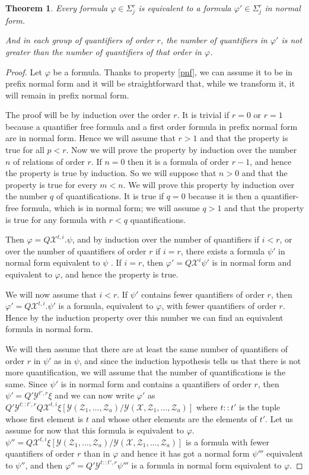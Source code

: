 \documentclass[a4paper,12pt]{article}
\newtheorem{theorem}{Theorem}[section]
\theoremstyle{definition}
\renewcommand{\phi}{\varphi}
\newcommand{\hob}[2]{\ensuremath{\Sigma^{#1}_{#2}}}
\newcommand{\mc}{\mathcal}
\begin{document}
\begin{theorem}
  Every formula $\phi\in\hob{r}{j}$ is equivalent to a formula
  $\phi'\in\hob{r}{j}$ in normal form. 

  And in each group of quantifiers of order $r$, the number of
  quantifiers in $\phi'$ is not greater than the number of quantifiers
  of that order in $\phi$.
\end{theorem}
\begin{proof}
  Let $\phi$ be a formula. Thanks to property \ref{pnf}, we can assume
  it to be in prefix normal form and it will be straightforward that,
  while we transform it, it will remain in prefix normal form.

  The proof will be by induction over the order $r$. It is trivial if
  $r=0$ or $r=1$ because a quantifier free formula and a first order
  formula in prefix normal form are in normal form. Hence we will
  assume that $r>1$ and that the property is true for all $p<r$. Now
  we will prove the property by induction over the number $n$ of
  relations of order $r$. If $n=0$ then it is a formula of order
  $r-1$, and hence the property is true by induction. So we will
  suppose that $n>0$ and that the property is true for every $m<n$. We
  will prove this property by induction over the number $q$ of
  quantifications. It is true if $q=0$ because it is then a
  quantifier-free formula, which is in normal form; we will assume
  $q>1$ and that the property is true for any formula with $r<q$
  quantifications.

  Then $\phi=Q \mc X^{t,i}.\psi$, and by induction over the number of
  quantifiers if $i<r$, or over the number of quantifiers of order $r$
  if $i=r$, there exists a formula $\psi'$ in normal form equivalent
  to $\psi$ . If $i=r$, then $\phi'=Q \mc X^i\psi'$ is in normal form
  and equivalent to $\phi$, and hence the property is true.

  We will now assume that $i<r$. If $\psi'$ contains fewer quantifiers
  of order $r$, then $\phi'=Q \mc X^{t,i}.\psi'$ is a formula, equivalent
  to $\phi$, with fewer quantifiers of order $r$. Hence by the
  induction property over this number we can find an equivalent
  formula in normal form.

  We will then assume that there are at least the same number of
  quantifiers of order $r$ in $\psi'$ as in $\psi$, and since the
  induction hypothesis tells us that there is not more quantification,
  we will assume that the number of quantifications is the same. Since
  $\psi'$ is in normal form and contains a quantifiers of order $r$,
  then $\psi'=Q'\mc Y^{t',r}\xi$ and we can now write $\phi'$ as
  $Q'\mc Y^{t::t',r}Q\mc{X}^{t,i}\xi[\mc Y(\mc Z_1,\dots,\mc Z_a)/\mc
  Y(\mc X,\mc Z_1,\dots,\mc Z_a)]$ where $t::t'$ is the tuple whose
  first element is $t$ and whose other elements are the elements of
  $t'$. Let us assume for now that this formula is equivalent to
  $\phi$. $\psi''=Q\mc{X}^{t,i}\xi[\mc Y(\mc Z_1,\dots,\mc Z_a)/\mc
  Y(\mc X,\mc Z_1,\dots,\mc Z_a)]$ is a formula with fewer quantifiers
  of order $r$ than in $\phi$ and hence it has got a normal form
  $\psi'''$ equivalent to $\psi''$, and then $\phi''=Q'\mc
  Y^{t::t',r}\psi'''$ is a formula in normal form equivalent to $
  \phi$.


\end{proof}
\end{document}
